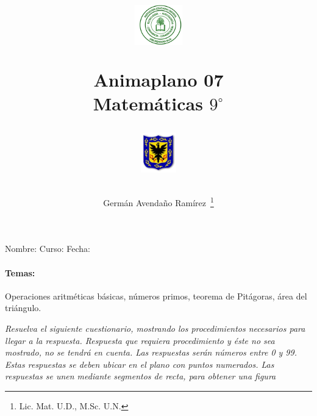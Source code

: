 \documentclass[letterpaper,10pt,twoside]{article}
\author{Germ\'an Avenda\~no Ram\'irez~\thanks{Lic. Mat. U.D., M.Sc. U.N.}}
\title{\begin{minipage}{.2\textwidth}
\includegraphics[height=1.75cm]{Images/logo-colegio.png}\end{minipage}
\begin{minipage}{.55\textwidth}
\begin{center}
Animaplano 07\\
Matemáticas $9^{\circ}$
\end{center}
\end{minipage}\hfill
\begin{minipage}{.2\textwidth}
\includegraphics[height=1.75cm]{Images/logo-sed.png} 
\end{minipage}}
\date{}
\begin{document}
\maketitle
Nombre: \hrulefill Curso: \underline{\hspace*{44pt}} Fecha: \underline{\hspace*{2.5cm}}
\paragraph*{Temas:} Operaciones aritméticas básicas, números primos, teorema de Pitágoras, área del triángulo.
\begin{multicols}{2}
\emph{Resuelva el siguiente cuestionario, mostrando los procedimientos necesarios para llegar a la respuesta. Respuesta que requiera procedimiento y éste no sea mostrado, no se tendrá en cuenta. Las respuestas serán números entre 0 y 99. Estas respuestas se deben ubicar en el plano con puntos numerados. Las respuestas se unen mediante segmentos de recta, para obtener una figura}

\end{multicols}
\end{document}
